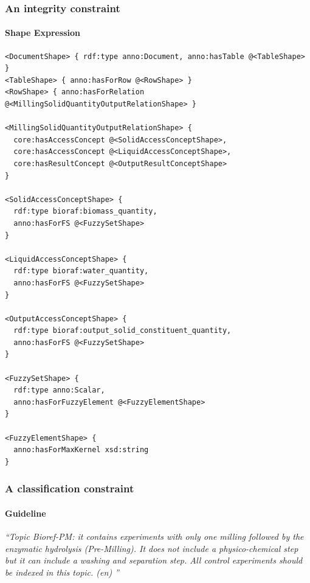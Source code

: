 \documentclass{beamer}
\begin{document}
\begin{frame}[fragile]
  \frametitle{An integrity constraint}
  \framesubtitle{Shape Expression}

  \begin{Verbatim}[fontsize=\tiny]
<DocumentShape> { rdf:type anno:Document, anno:hasTable @<TableShape> }
<TableShape> { anno:hasForRow @<RowShape> }
<RowShape> { anno:hasForRelation @<MillingSolidQuantityOutputRelationShape> }

<MillingSolidQuantityOutputRelationShape> {
  core:hasAccessConcept @<SolidAccessConceptShape>,
  core:hasAccessConcept @<LiquidAccessConceptShape>,
  core:hasResultConcept @<OutputResultConceptShape>
}

<SolidAccessConceptShape> {
  rdf:type bioraf:biomass_quantity,
  anno:hasForFS @<FuzzySetShape>
}

<LiquidAccessConceptShape> {
  rdf:type bioraf:water_quantity,
  anno:hasForFS @<FuzzySetShape>
}

<OutputAccessConceptShape> {
  rdf:type bioraf:output_solid_constituent_quantity,
  anno:hasForFS @<FuzzySetShape>
}

<FuzzySetShape> {
  rdf:type anno:Scalar,
  anno:hasForFuzzyElement @<FuzzyElementShape>
}

<FuzzyElementShape> {
  anno:hasForMaxKernel xsd:string
}
  \end{Verbatim}

\end{frame}

\begin{frame}
  \frametitle{A classification constraint}
  \framesubtitle{Guideline}

  \textit{``Topic Bioref-PM: it contains experiments with only one milling
    followed by the enzymatic hydrolysis (Pre-Milling). It does not include a
    physico-chemical step but it can include a washing and separation step. All
    control experiments should be indexed in this topic. (en) ''}
\end{frame}
\end{document}

